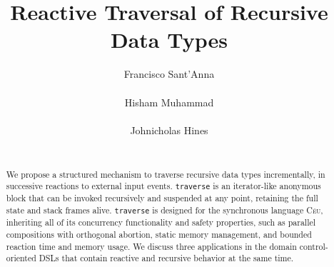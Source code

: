 \documentclass{sig-alternate}
\newcommand{\CEU}{\textsc{C\'{e}u}\xspace}
\newcommand{\code}[1] {{\small{\texttt{#1}}}}
\begin{document}
\title{Reactive Traversal of Recursive Data Types}

\author{
\alignauthor
Francisco Sant'Anna \\
     \\
\alignauthor
Hisham Muhammad \\
     \\
\alignauthor
Johnicholas Hines \\
     \\
}

\maketitle
\begin{abstract}
We propose a structured mechanism to traverse recursive data types 
incrementally, in successive reactions to external input events.
\code{traverse} is an iterator-like anonymous block that can be invoked 
recursively and suspended at any point, retaining the full state and stack 
frames alive.
\code{traverse} is designed for the synchronous language \CEU, inheriting all 
of its concurrency functionality and safety properties, such as parallel 
compositions with orthogonal abortion, static memory management, and bounded 
reaction time and memory usage.
We discuss three applications in the domain control-oriented DSLs that contain 
reactive and recursive behavior at the same time.

\end{abstract}
\end{document}
